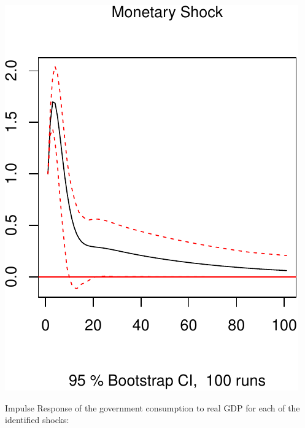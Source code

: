 \documentclass[11pt,preprint, authoryear]{elsarticle}
\numberwithin{equation}{section}
\numberwithin{figure}{section}
\numberwithin{table}{section}
\begin{document}
\includegraphics{TS_proj_files/figure-latex/unnamed-chunk-34-3.pdf}

Impulse Response of the government consumption to real GDP for each of
the identified shocks:
\end{document}
